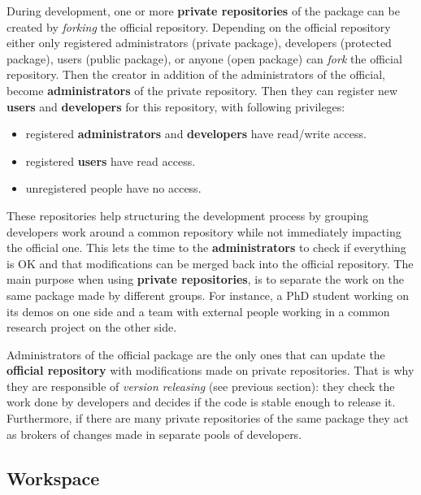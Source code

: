 \documentclass[12pt,a4paper]{article}
\begin{document}
During development, one or more \textbf{private repositories} of the package can be created by \textit{forking} the official repository. Depending on the official repository either only registered administrators (private package), developers (protected package), users (public package), or anyone (open package) can \textit{fork} the official repository. Then the creator in addition of the administrators of the official, become \textbf{administrators} of the private repository. Then they can register new \textbf{users} and \textbf{developers} for this repository, with following privileges:
\begin{itemize}
\item registered \textbf{administrators} and \textbf{developers} have read/write access.
\item registered \textbf{users} have read access.
\item unregistered people have no access.
\end{itemize}

These repositories help structuring the development process by grouping developers work around a common repository while not immediately impacting the official one. This lets the time to the \textbf{administrators} to check if everything is OK and that modifications can be merged back into the official repository. The main purpose when using \textbf{private repositories}, is to separate the work on the same package made by different groups. For instance, a PhD student working on its demos on one side and a team with external people working in a common research project on the other side.

Administrators of the official package are the only ones that can update the \textbf{official repository} with modifications made on private repositories. That is why they are responsible of \textit{version releasing} (see previous section): they check the work done by developers and decides if the code is stable enough to release it. Furthermore, if there are many private repositories of the same package they act as brokers of changes made in separate pools of developers.

\subsection{Workspace}
\end{document}
